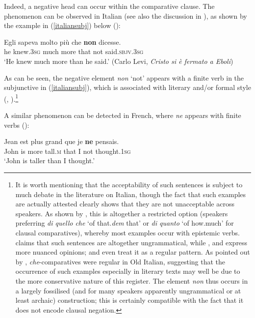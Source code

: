 Indeed, a negative head can occur within the comparative clause. The phenomenon can be observed in Italian (see also the discussion in \citealt[535]{seuren1973}), as shown by the example in (\ref{italiansubj}) below (\citealt[46, ex. 2--82]{grimaldi2009}):

\ea \gll Egli sapeva molto pi\`{u} che \textbf{non} dicesse. \label{italiansubj}\\
he knew.\textsc{3sg} much more that not said.\textsc{sbjv.3sg}\\
\glt `He knew much more than he said.' (Carlo Levi, \textit{Cristo si \`{e} fermato a Eboli})
\z

As can be seen, the negative element \textit{non} `not' appears with a finite verb in the subjunctive in (\ref{italiansubj}), which is associated with literary and/or formal style (\citealt[46]{grimaldi2009}, \citealt[535]{seuren1973}).\footnote{It is worth mentioning that the acceptability of such sentences is subject to much debate in the literature on Italian, though the fact that such examples are actually attested clearly shows that they are not unacceptable across speakers. As shown by \citet[45--48]{grimaldi2009}, this is altogether a restricted option (speakers preferring \textit{di quello che} `of that.\textit{dem} that' or \textit{di quanto} `of how.much' for clausal comparatives), whereby most examples occur with epistemic verbs. \citet[848]{belletti1991} claims that such sentences are altogether ungrammatical, while \citet[683--689]{schwarze1995}, \citet[205]{donati2000} and \citet[459]{wandruszka1991} express more nuanced opinions; \citet[519]{serianni1988} and \citet[150--159]{price1990} even treat it as a regular pattern. As pointed out by \citet[46]{grimaldi2009}, \textit{che}-comparatives were regular in Old Italian, suggesting that the occurrence of such examples especially in literary texts may well be due to the more conservative nature of this register. The element \textit{non} thus occurs in a largely fossilised (and for many speakers apparently ungrammatical or at least archaic) construction; this is certainly compatible with the fact that it does not encode clausal negation.}

A similar phenomenon can be detected in French, where \textit{ne} appears with finite verbs (\citealt[535, ex. 44]{seuren1973}):

\ea \gll Jean est plus grand que je \textbf{ne} pensais. \label{french}\\
John is more tall.\textsc{m} that I not thought.\textsc{1sg}\\
\glt `John is taller than I thought.'
\z


